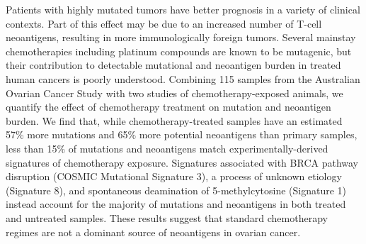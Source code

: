Patients with highly mutated tumors have better prognosis in a variety of clinical contexts. Part of this effect may be due to an increased number of T-cell neoantigens, resulting in more immunologically foreign tumors. Several mainstay chemotherapies including platinum compounds are known to be mutagenic, but their contribution to detectable mutational and neoantigen burden in treated human cancers is poorly understood. Combining 115 samples from the Australian Ovarian Cancer Study with two studies of chemotherapy-exposed animals, we quantify the effect of chemotherapy treatment on mutation and neoantigen burden. We find that, while chemotherapy-treated samples have an estimated 57\% more mutations and 65\% more potential neoantigens than primary samples, less than 15\% of mutations and neoantigens match experimentally-derived signatures of chemotherapy exposure. Signatures associated with BRCA pathway disruption (COSMIC Mutational Signature 3), a process of unknown etiology (Signature 8), and spontaneous deamination of 5-methylcytosine (Signature 1) instead account for the majority of mutations and neoantigens in both treated and untreated samples. These results suggest that standard chemotherapy regimes are not a dominant source of neoantigens in ovarian cancer.

